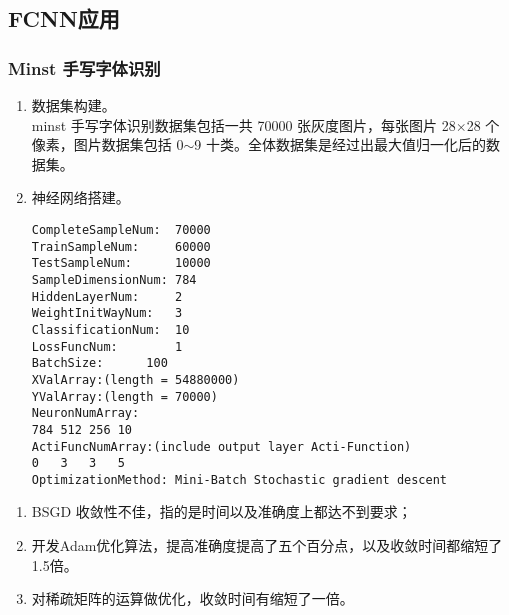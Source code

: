 \newpage
\subsection{FCNN应用}
\subsubsection{Minst 手写字体识别}

\begin{enumerate}
  \item 数据集构建。\\
  minst 手写字体识别数据集包括一共 70000 张灰度图片，每张图片 28$\times$28 个像素，图片数据集包括 0$\sim$9 十类。全体数据集是经过出最大值归一化后的数据集。
  \item 神经网络搭建。
\begin{lstlisting}
CompleteSampleNum:	70000
TrainSampleNum:		60000
TestSampleNum:		10000
SampleDimensionNum:	784
HiddenLayerNum:		2
WeightInitWayNum:	3
ClassificationNum:	10
LossFuncNum:		1
BatchSize:		100
XValArray:(length = 54880000)	
YValArray:(length = 70000)	
NeuronNumArray:	
784	512	256	10	
ActiFuncNumArray:(include output layer Acti-Function)	
0	3	3	5	
OptimizationMethod: Mini-Batch Stochastic gradient descent
  \end{lstlisting}
\end{enumerate}

\begin{enumerate}
  \item BSGD 收敛性不佳，指的是时间以及准确度上都达不到要求；
  \item 开发Adam优化算法，提高准确度提高了五个百分点，以及收敛时间都缩短了1.5倍。
  \item 对稀疏矩阵的运算做优化，收敛时间有缩短了一倍。
\end{enumerate}
